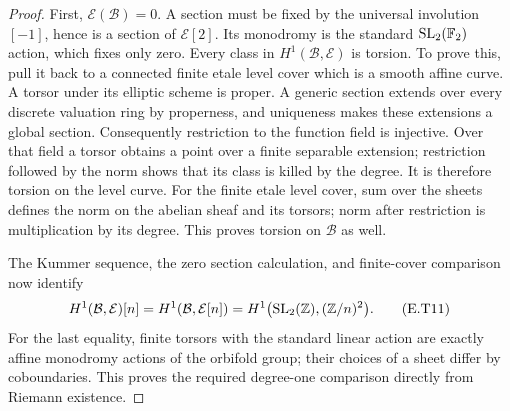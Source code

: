 \begin{proof}
First, $\mathcal E(\mathcal B)=0$.  A section must be fixed
by the universal involution $[-1]$, hence is a section of
$\mathcal E[2]$.  Its monodromy is the standard
$\operatorname{SL}_2(\mathbb F_2)$ action, which fixes only zero.
Every class in $H^1(\mathcal B,\mathcal E)$ is torsion.
To prove this, pull it back to a connected finite etale
level cover which is a smooth affine curve.  A torsor
under its elliptic scheme is proper.  A generic section
extends over every discrete valuation ring by properness,
and uniqueness makes these extensions a global section.
Consequently restriction to the function field is
injective.  Over that field a torsor obtains a point
over a finite separable extension; restriction followed
by the norm shows that its class is killed by the
degree.  It is therefore torsion on the level curve.
For the finite etale level cover, sum over the sheets
defines the norm on the abelian sheaf and its torsors;
norm after restriction is multiplication by its degree.
This proves torsion on $\mathcal B$ as well.

The Kummer sequence, the zero section calculation, and
finite-cover comparison now identify
\[
 H^1(\mathcal B,\mathcal E)[n]
   =H^1(\mathcal B,\mathcal E[n])
   =H^1\bigl(\operatorname{SL}_2(\mathbb Z),(\mathbb Z/n)^2\bigr).
 \tag{E.T11}
\]
For the last equality, finite torsors with the standard
linear action are exactly affine monodromy actions of
the orbifold group; their choices of a sheet differ
by coboundaries.  This proves the required degree-one
comparison directly from Riemann existence.


\end{proof}
